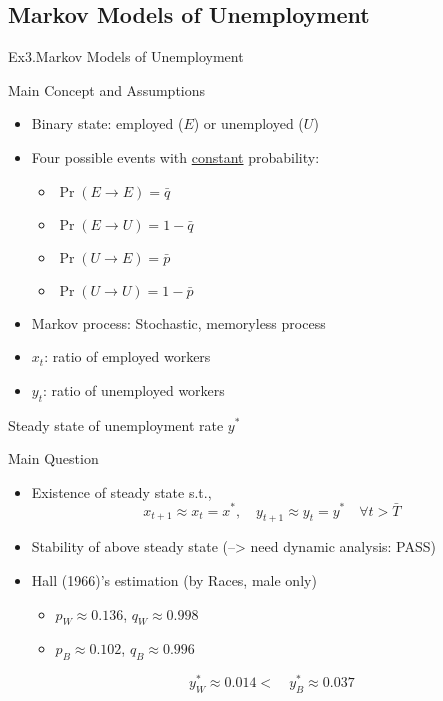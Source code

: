 \documentclass[a4paper,11pt]{article}
\begin{document}
\subsection{Markov Models of Unemployment} %
\label{sub:markov_models_of_unemployment}
\begin{frame}[t]{Ex3.Markov Models of Unemployment}
	\begin{block}
		{Main Concept and Assumptions}
		\begin{itemize}
			\item Binary state: employed ($E$) or unemployed ($U$)
			\item Four possible events with \uline{constant} probability: 
			\begin{itemize}
				\item $\Pr(E\rightarrow E)=\bar q$
				\item $\Pr(E\rightarrow U)=1-\bar q$
				\item $\Pr(U\rightarrow E)=\bar p$
				\item $\Pr(U\rightarrow U)=1-\bar p$
			\end{itemize}
			\item Markov process: Stochastic, memoryless process
			\item $x_t$: ratio of employed workers
			\item $y_t$: ratio of unemployed workers
		\end{itemize}
	\end{block}
\end{frame}
\begin{frame}[t]{Steady state of unemployment rate $y^\ast$}
	\begin{block}
		{Main Question}
		\begin{itemize}
			\item Existence of steady state s.t., 
			\[
				x_{t+1} \approx x_t = x^\ast,\quad y_{t+1} \approx y_t=y^\ast \quad \forall t>\bar T
			\]
			\item Stability of above steady state (--> need dynamic analysis: PASS)
		\end{itemize}
	\end{block}
	\begin{itemize}
		\item Hall (1966)'s estimation (by Races, male only)
		\begin{itemize}
			\item $p_{W}\approx 0.136$, $q_{W}\approx 0.998$
			\item $p_{B}\approx 0.102$, $q_{B}\approx 0.996$
		\end{itemize}
		\[
			y_{W}^\ast \approx 0.014 < \quad y_{B}^\ast \approx 0.037
		\]
	\end{itemize}
\end{frame}
\end{document}
